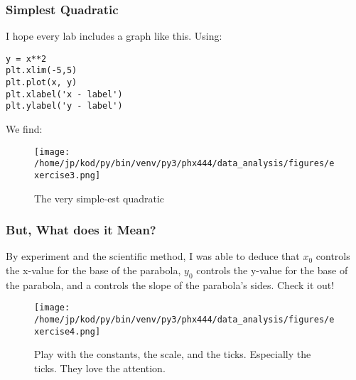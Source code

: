 \documentclass{article}
\begin{document}
\subsubsection{Simplest Quadratic}
I hope every lab includes a graph like this. Using:

\begin{center}
\begin{minipage}[t]{.75\textwidth}
    \begin{lstlisting}[caption= Just in Case, frame=tlrb]
y = x**2
plt.xlim(-5,5)
plt.plot(x, y)
plt.xlabel('x - label')
plt.ylabel('y - label')
\end{lstlisting}
\end{minipage}
\end{center}
We find:
\begin{figure}[H]
        \begin{center}
        \texttt{[image: /home/jp/kod/py/bin/venv/py3/phx444/data\_analysis/figures/exercise3.png]}
        \caption{The very simple-est quadratic}
        \label{fig:fig_6}
        \end{center}
\end{figure}

\subsubsection{But, What does it Mean?}
By experiment and the scientific method, I was able to deduce that $x_0$
controls the x-value for the base of the parabola, $y_0$ controls the y-value
for the base of the parabola, and a controls the slope of the parabola's sides.
Check it out!

\begin{figure}[H]
        \begin{center}
        \texttt{[image: /home/jp/kod/py/bin/venv/py3/phx444/data\_analysis/figures/exercise4.png]}
        \caption{Play with the constants, the scale, and the ticks. Especially
            the ticks. They love the attention.}
        \label{fig:fig_7}
        \end{center}
\end{figure}
\end{document}
